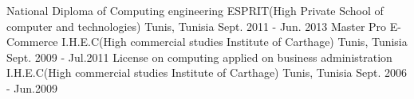 \begin{cventries}
  \cventry
    {National Diploma of Computing engineering}
    {ESPRIT(High Private School of computer and technologies)}
    {Tunis, Tunisia}
    {Sept. 2011 - Jun. 2013}
    {
    }
  \cventry
    {Master Pro E-Commerce }
    {I.H.E.C(High commercial studies Institute of Carthage)}
    {Tunis, Tunisia}
    {Sept. 2009 - Jul.2011}
    {
    }    
  \cventry
    {License on computing applied on business administration}
    {I.H.E.C(High commercial studies Institute of Carthage)}
    {Tunis, Tunisia}
    {Sept. 2006 - Jun.2009}
    {
    }      
\end{cventries}
